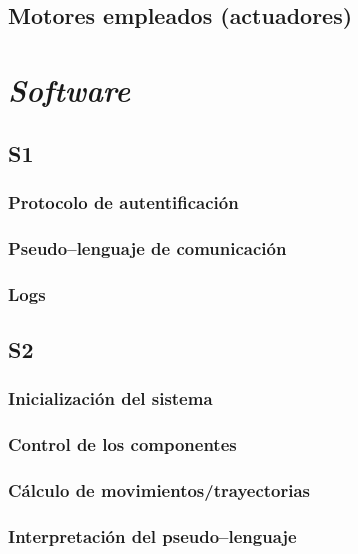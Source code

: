 \section{Motores empleados (actuadores)}


\chapter{\textit{Software}}
\label{chap:software}

\section{S1}

\subsection{Protocolo de autentificación}

\subsection{Pseudo--lenguaje de comunicación}

\subsection{Logs}

\section{S2}

\subsection{Inicialización del sistema}

\subsection{Control de los componentes}

\subsection{Cálculo de movimientos/trayectorias}

\subsection{Interpretación del pseudo--lenguaje}

